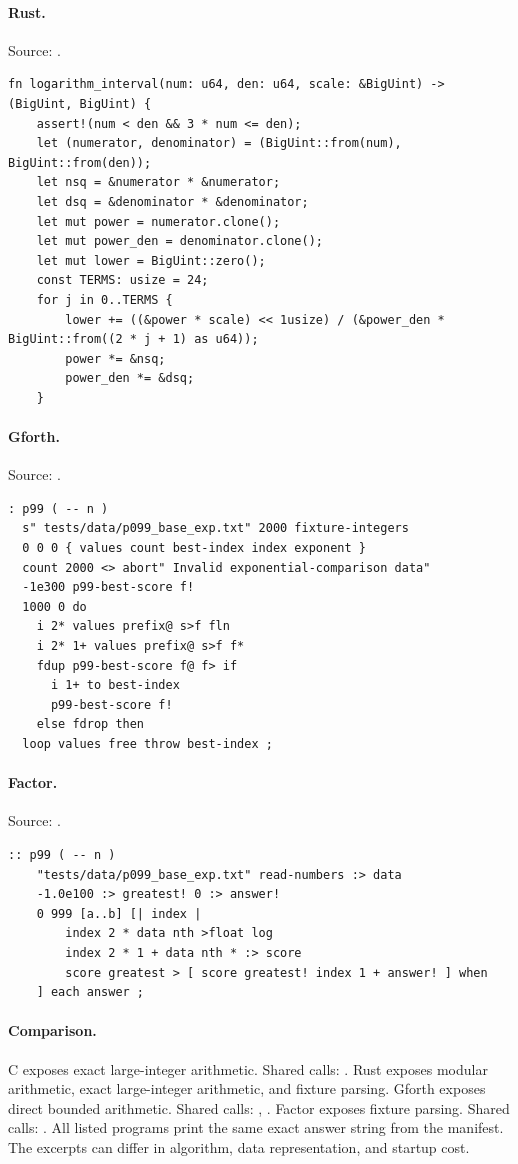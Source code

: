 \paragraph{Rust.} Source: .
\begin{lstlisting}
fn logarithm_interval(num: u64, den: u64, scale: &BigUint) -> (BigUint, BigUint) {
    assert!(num < den && 3 * num <= den);
    let (numerator, denominator) = (BigUint::from(num), BigUint::from(den));
    let nsq = &numerator * &numerator;
    let dsq = &denominator * &denominator;
    let mut power = numerator.clone();
    let mut power_den = denominator.clone();
    let mut lower = BigUint::zero();
    const TERMS: usize = 24;
    for j in 0..TERMS {
        lower += ((&power * scale) << 1usize) / (&power_den * BigUint::from((2 * j + 1) as u64));
        power *= &nsq;
        power_den *= &dsq;
    }
\end{lstlisting}

\paragraph{Gforth.} Source: .
\begin{lstlisting}
: p99 ( -- n )
  s" tests/data/p099_base_exp.txt" 2000 fixture-integers
  0 0 0 { values count best-index index exponent }
  count 2000 <> abort" Invalid exponential-comparison data"
  -1e300 p99-best-score f!
  1000 0 do
    i 2* values prefix@ s>f fln
    i 2* 1+ values prefix@ s>f f*
    fdup p99-best-score f@ f> if
      i 1+ to best-index
      p99-best-score f!
    else fdrop then
  loop values free throw best-index ;
\end{lstlisting}

\paragraph{Factor.} Source: .
\begin{lstlisting}
:: p99 ( -- n )
    "tests/data/p099_base_exp.txt" read-numbers :> data
    -1.0e100 :> greatest! 0 :> answer!
    0 999 [a..b] [| index |
        index 2 * data nth >float log
        index 2 * 1 + data nth * :> score
        score greatest > [ score greatest! index 1 + answer! ] when
    ] each answer ;
\end{lstlisting}

\paragraph{Comparison.}
C exposes exact large-integer arithmetic. Shared calls: \texttt{}. Rust exposes modular arithmetic, exact large-integer arithmetic, and fixture parsing. Gforth exposes direct bounded arithmetic. Shared calls: \texttt{}, \texttt{}. Factor exposes fixture parsing. Shared calls: \texttt{}.
All listed programs print the same exact answer string from the manifest. The excerpts can differ in algorithm, data representation, and startup cost.

